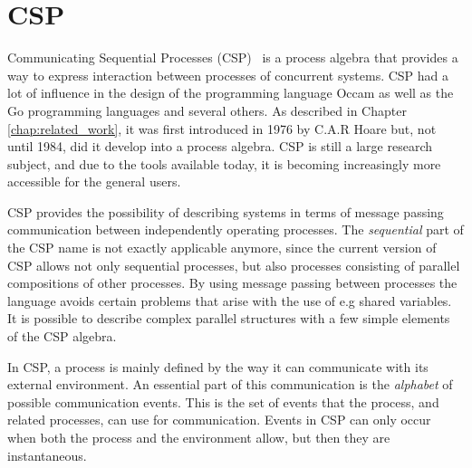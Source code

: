 \section{CSP}
\label{sec:csp_background}
Communicating Sequential Processes (CSP)~\cite{Hoare1978} is a process algebra that provides a way to express interaction between processes of concurrent systems.
CSP had a lot of influence in the design of the programming language Occam as well as the Go programming languages and several others. As described in Chapter \ref{chap:related_work}, it was first introduced in 1976 by C.A.R Hoare but, not until 1984, did it develop into a process algebra. CSP is still a large research subject, and due to the tools available today, it is becoming increasingly more accessible for the general users.

CSP provides the possibility of describing systems in terms of message passing communication between independently operating processes. The \textit{sequential} part of the CSP name is not exactly applicable anymore, since the current version of CSP allows not only sequential processes, but also processes consisting of parallel compositions of other processes.
By using message passing between processes the language avoids certain problems that arise with the use of e.g shared variables.
It is possible to describe complex parallel structures with a few simple elements of the CSP algebra.

In CSP, a process is mainly defined by the way it can communicate with its external environment. An essential part of this communication is the \textit{alphabet} of possible communication events. This is the set of events that the process, and related processes, can use for communication. Events in CSP can only occur when both the process and the environment allow, but then they are instantaneous.


